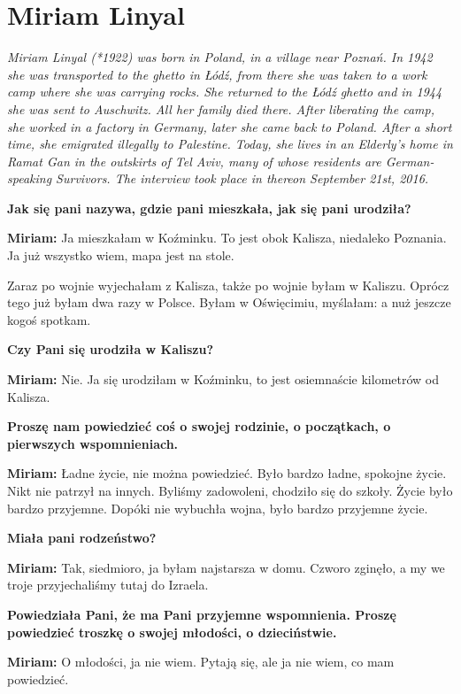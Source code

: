 \section{Miriam Linyal}

\textit{Miriam Linyal (*1922) was born in Poland, in a village near Poznań. In 1942 she was transported to the ghetto in Łódź, from there she was taken to a work camp where she was carrying rocks. She returned to the Łódź ghetto and in 1944 she was sent to Auschwitz. All her family died there. After liberating the camp, she worked in a factory in Germany, later she came back to Poland. After a short time, she emigrated illegally to Palestine. Today, she lives in an Elderly’s home in Ramat Gan in the outskirts of Tel Aviv, many of whose residents are German-speaking Survivors. The interview took place in thereon September 21st, 2016.}\par
\vspace*{2em}
\textbf{Jak się pani nazywa, gdzie pani mieszkała, jak się pani urodziła?} 

\textbf{Miriam:} Ja mieszkałam w Koźminku. To jest obok Kalisza, niedaleko Poznania. Ja już wszystko wiem, mapa jest na stole.  

Zaraz po wojnie wyjechałam z Kalisza, także po wojnie byłam w Kaliszu. Oprócz tego już byłam dwa razy w Polsce. Byłam w Oświęcimiu, myślałam: a nuż jeszcze kogoś spotkam. 

\textbf{Czy Pani się urodziła w Kaliszu?} 

\textbf{Miriam:} Nie. Ja się urodziłam w Koźminku, to jest osiemnaście kilometrów od Kalisza. 

\textbf{Proszę nam powiedzieć coś o swojej rodzinie, o początkach, o pierwszych wspomnieniach.} 

\textbf{Miriam:} Ładne życie, nie można powiedzieć. Było bardzo ładne, spokojne życie. Nikt nie patrzył na innych. Byliśmy zadowoleni, chodziło się do szkoły. Życie było bardzo przyjemne. Dopóki nie wybuchła wojna, było bardzo przyjemne życie. 

\textbf{Miała pani rodzeństwo?} 

\textbf{Miriam:} Tak, siedmioro, ja byłam najstarsza w domu. Czworo zginęło, a my we troje przyjechaliśmy tutaj do Izraela. 

\textbf{Powiedziała Pani, że ma Pani przyjemne wspomnienia. Proszę powiedzieć troszkę o swojej młodości, o dzieciństwie.} 

\textbf{Miriam:} O młodości, ja nie wiem. Pytają się, ale ja nie wiem, co mam powiedzieć. 

